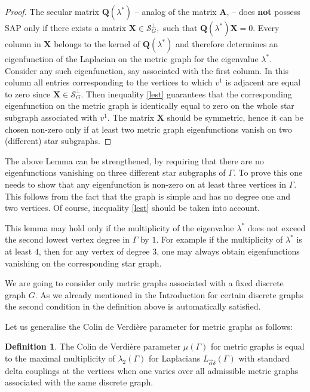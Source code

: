 \documentclass{amsart}
\theoremstyle{definition}
\newtheorem{definition}[theorem]{Definition}
\theoremstyle{remark}
\numberwithin{equation}{section}
\newcommand{\Sc}{\mathcal{S}}
\begin{document}
\begin{proof}
The secular matrix $ \mathbf Q(\lambda^*) $ -- analog of the matrix $ \mathbf A $, -- does {\bf not} possess SAP only if there exists a
matrix $ \mathbf X \in \Sc_G^\perp ,$ such that $ \mathbf Q(\lambda^*) \mathbf X = 0 .$
Every column in $ \mathbf X $ belongs to the kernel of $ \mathbf Q(\lambda^*) $ and therefore
determines an eigenfunction of the Laplacian on the metric graph for the eigenvalue $ \lambda^*$.
Consider any such eigenfunction, say associated with the first column. In this column all entries corresponding to
the vertices to which $ v^1 $ is adjacent are equal to zero since $ \mathbf X  \in \Sc_G^\perp$. Then inequality 
\eqref{lest} guarantees that the corresponding eigenfunction
on the metric graph is identically equal to zero on the whole star subgraph associated with  $ v^1 $.
The matrix $ \mathbf X $ should be symmetric, hence it can be chosen non-zero only if
at least two metric graph eigenfunctions vanish on two (different) star subgraphs.
\end{proof}

The above Lemma can be strengthened, by requiring that there are no eigenfunctions vanishing on three different star subgraphs of
$ \Gamma $. To prove this one needs to show that any eigenfunction is non-zero on at least three vertices in $ \Gamma$. This follows
from the fact that the graph is simple and has no degree one and two vertices. Of course, inequality \eqref{lest}
should be taken into account.

This lemma may hold only if the multiplicity of the eigenvalue $ \lambda^*$
does not exceed the second lowest vertex degree in $ \Gamma $ by $1$.
For example if the multiplicity of $ \lambda^* $ is at least $4$, then for any vertex of degree $3$, one may always obtain 
eigenfunctions vanishing on the corresponding star graph.




We are going to consider only metric graphs associated with a fixed discrete graph $ G$. As we already mentioned in
the Introduction for certain discrete graphs the second condition in the definition above
is automatically satisfied.


Let us generalise the Colin de Verdi\`ere parameter  for metric graphs as follows:
\begin{definition}
The Colin de Verdi\` ere parameter $ \mu (\Gamma) $ for metric graphs is equal to
the maximal multiplicity of $\lambda_2 (\Gamma) $ for Laplacians  $ L_{\vec{\alpha} \delta} (\Gamma) $ with standard delta couplings at the vertices when one varies
over all admissible metric graphs associated with the same discrete graph.
\end{definition}
\end{document}
